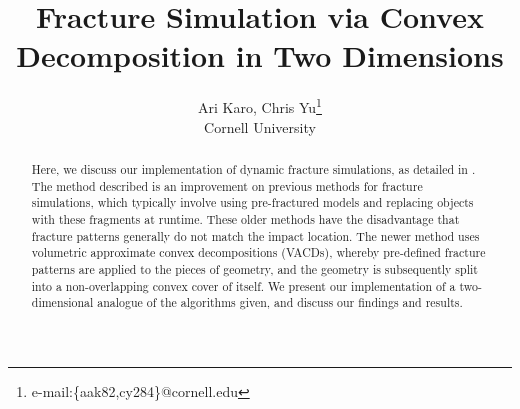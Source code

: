 \documentclass[tog]{acmsiggraph}
\title{Fracture Simulation via Convex Decomposition in Two Dimensions}
\author{Ari Karo, Chris
  Yu\thanks{e-mail:\{aak82,cy284\}@cornell.edu}\\Cornell University}
\begin{document}



\maketitle


\begin{abstract}

Here, we discuss our implementation of dynamic fracture simulations,
as detailed in \cite{Mul13}. The method described is an improvement on
previous methods for fracture simulations, which typically involve
using pre-fractured models and replacing objects with these fragments
at runtime. These older methods have the disadvantage that fracture
patterns generally do not match the impact location. The newer method
uses volumetric approximate convex decompositions (VACDs), whereby
pre-defined fracture patterns are applied to the pieces of geometry,
and the geometry is subsequently split into a non-overlapping convex
cover of itself. We present our implementation of a two-dimensional
analogue of the algorithms given, and discuss our findings and
results.

\end{abstract}
\end{document}
